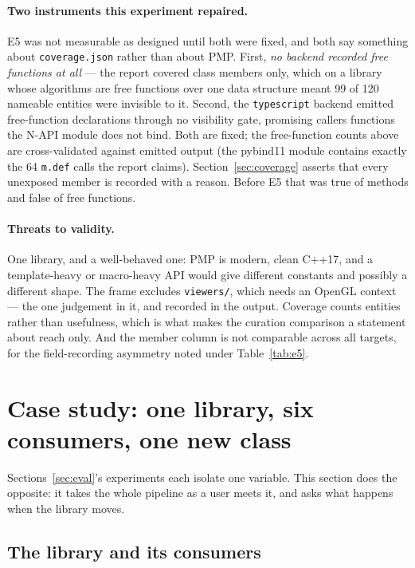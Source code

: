 \documentclass[11pt,a4paper]{article}
\newcommand{\code}[1]{\texttt{\small #1}}
\begin{document}
\paragraph{Two instruments this experiment repaired.} E5 was not measurable as
designed until both were fixed, and both say something about
\code{coverage.json} rather than about PMP. First, \emph{no backend recorded
free functions at all} --- the report covered class members only, which on a
library whose algorithms are free functions over one data structure meant 99 of
120 nameable entities were invisible to it. Second, the \code{typescript}
backend emitted free-function declarations through no visibility gate,
promising callers functions the N-API module does not bind. Both are fixed;
the free-function counts above are cross-validated against emitted output (the
pybind11 module contains exactly the 64 \code{m.def} calls the report claims).
Section~\ref{sec:coverage} asserts that every unexposed member is recorded with
a reason. Before E5 that was true of methods and false of free functions.

\paragraph{Threats to validity.} One library, and a well-behaved one: PMP is
modern, clean C++17, and a template-heavy or macro-heavy API would give
different constants and possibly a different shape. The frame excludes
\code{viewers/}, which needs an OpenGL context --- the one judgement in it, and
recorded in the output. Coverage counts entities rather than usefulness, which
is what makes the curation comparison a statement about reach only. And the
member column is not comparable across all targets, for the field-recording
asymmetry noted under Table~\ref{tab:e5}.

\section{Case study: one library, six consumers, one new class}
\label{sec:case}

Sections~\ref{sec:eval}'s experiments each isolate one variable. This section
does the opposite: it takes the whole pipeline as a user meets it, and asks what
happens when the library moves.

\subsection{The library and its consumers}
\end{document}
